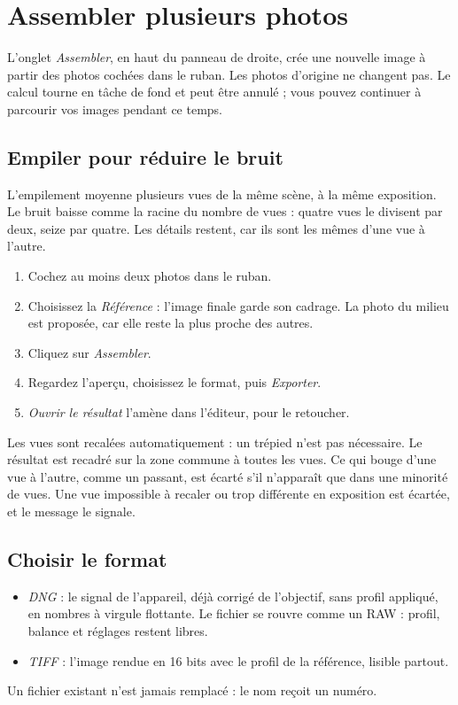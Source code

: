 \chapter{Assembler plusieurs photos}
L’onglet \emph{Assembler}, en haut du panneau de droite, crée une nouvelle image à
partir des photos cochées dans le ruban. Les photos d’origine ne changent pas. Le
calcul tourne en tâche de fond et peut être annulé ; vous pouvez continuer à parcourir
vos images pendant ce temps.

\section{Empiler pour réduire le bruit}
L’empilement moyenne plusieurs vues de la même scène, à la même exposition. Le bruit
baisse comme la racine du nombre de vues : quatre vues le divisent par deux, seize par
quatre. Les détails restent, car ils sont les mêmes d’une vue à l’autre.

\begin{enumerate}
\item Cochez au moins deux photos dans le ruban.
\item Choisissez la \emph{Référence} : l’image finale garde son cadrage. La photo du
milieu est proposée, car elle reste la plus proche des autres.
\item Cliquez sur \emph{Assembler}.
\item Regardez l’aperçu, choisissez le format, puis \emph{Exporter}.
\item \emph{Ouvrir le résultat} l’amène dans l’éditeur, pour le retoucher.
\end{enumerate}

Les vues sont recalées automatiquement : un trépied n’est pas nécessaire. Le résultat
est recadré sur la zone commune à toutes les vues. Ce qui bouge d’une vue à l’autre,
comme un passant, est écarté s’il n’apparaît que dans une minorité de vues. Une vue
impossible à recaler ou trop différente en exposition est écartée, et le message le
signale.

\section{Choisir le format}
\begin{itemize}
\item \emph{DNG} : le signal de l’appareil, déjà corrigé de l’objectif, sans profil
appliqué, en nombres à virgule flottante. Le fichier se rouvre comme un RAW : profil,
balance et réglages restent libres.
\item \emph{TIFF} : l’image rendue en 16 bits avec le profil de la référence, lisible
partout.
\end{itemize}
Un fichier existant n’est jamais remplacé : le nom reçoit un numéro.

